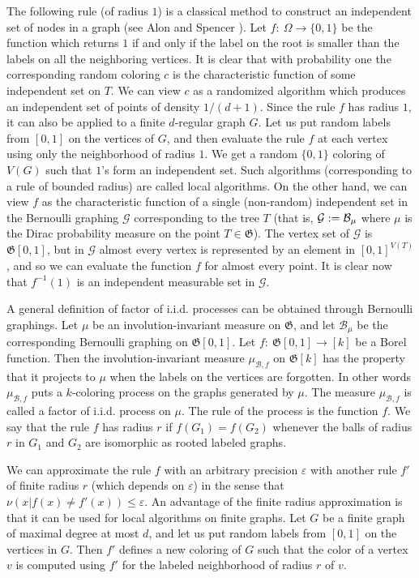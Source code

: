 \documentclass{article}
\def\GG{\mathcal{G}}\def\HH{\mathcal{H}}\def\II{\mathcal{I}}
\def\Gf{\mathfrak{G}}\def\Hf{\mathfrak{H}}\def\If{\mathfrak{I}}
\def\eps{\varepsilon}
\begin{document}
The following rule (of radius {$1$}) is a classical method to
construct an independent set of nodes in a graph (see Alon and
Spencer \cite{AlSp}). Let $f:~\Omega\rightarrow\{0,1\}$ be the
function which returns $1$ if and only if the label on the root is
smaller than the labels on all the neighboring vertices. It is clear
that with probability one the corresponding random coloring $c$ is
the characteristic function of some independent set on $T$. We can
view $c$ as a randomized algorithm which produces an independent set
of points of density $1/(d+1)$. Since the rule $f$ has radius {$1$},
it can also be applied to a finite $d$-regular graph $G$. Let us put
random labels from $[0,1]$ on the vertices of $G$, and then evaluate
the rule $f$ at each vertex using only the neighborhood of radius
$1$. We get a random $\{0,1\}$ coloring of $V(G)$ such that $1$'s
form an independent set. Such algorithms (corresponding to a rule of
bounded radius) are called local algorithms. On the other hand, we
can view $f$ as the characteristic function of a single (non-random)
independent set in the Bernoulli graphing $\GG$ corresponding to the
tree $T$ (that is, $\GG:=\BB_\mu$ where $\mu$ is the {Dirac}
probability measure on the point $T \in \Gf$). The vertex set of
$\GG$ is $\Gf[0,1]$, but in $\GG$ almost every vertex is represented
by an element in $[0,1]^{V(T)}$, and so we can evaluate the function
$f$ for almost every point. It is clear now that $f^{-1}(1)$ is an
independent measurable set in $\GG$.

A general definition of factor of i.i.d. processes can be obtained
through Bernoulli graphings. Let $\mu$ be an involution-invariant
measure on $\Gf$, and let $\mathcal{B}_\mu$ be the corresponding
Bernoulli graphing on $\Gf[0,1]$. Let $f:~\Gf[0,1]\rightarrow [k]$ be
a Borel function. Then the involution-invariant measure
$\mu_{\mathcal{B},f}$ on $\Gf[k]$ has the property that it projects
to $\mu$ when the labels on the vertices are forgotten. In other
words $\mu_{\mathcal{B},f}$ puts a $k$-coloring process on the graphs
generated by $\mu$. The measure $\mu_{\mathcal{B},f}$ is called a
factor of i.i.d. process on $\mu$.  The rule of the process is the
function $f$. We say that the rule $f$ has radius $r$ if
$f(G_1)=f(G_2)$ whenever the balls of radius $r$ in $G_1$ and $G_2$
are isomorphic as rooted labeled graphs.

We can approximate the rule $f$ with an arbitrary precision $\eps$
with another rule $f'$ of finite radius $r$ (which depends on $\eps$)
in the sense that $\nu(x|f(x)\neq f'(x))\leq\eps$. An advantage of
the finite radius approximation is that it can be used for local
algorithms on finite graphs. Let $G$ be a finite graph of maximal
degree at most $d$, and let us put random labels from $[0,1]$ on the
vertices in $G$. Then $f'$ defines a new coloring of $G$ such that
the color of a vertex $v$ is computed using $f'$ for the labeled
neighborhood of radius $r$ of $v$.
\end{document}
